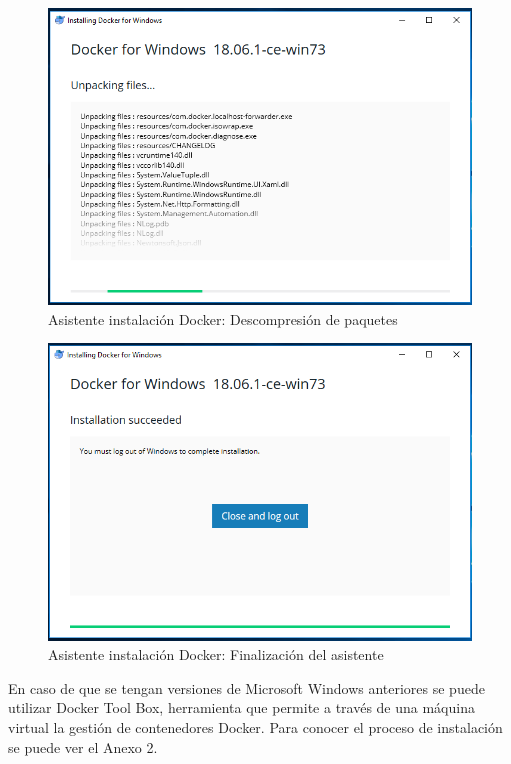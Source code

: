 \begin{figure}[!hbtp]
	\centering
	\includegraphics[width=\linewidth]{RE05_Docker/Instalacion_Windows/REDocker_Instalacion_Windows03.png}
	\vspace{-0.2cm}
	\caption{Asistente instalación Docker: Descompresión de paquetes}
	\label{fig:InstalacionDockerWin3}
\end{figure}

\begin{figure}[!hbtp]
	\centering
	\includegraphics[width=\linewidth]{RE05_Docker/Instalacion_Windows/REDocker_Instalacion_Windows04.png}
	\vspace{-0.2cm}
	\caption{Asistente instalación Docker: Finalización del asistente}
	\label{fig:InstalacionDockerWin4}
\end{figure}

En caso de que se tengan versiones de Microsoft Windows anteriores se puede utilizar Docker Tool Box, herramienta que permite a través de una máquina virtual la gestión de contenedores Docker. Para conocer el proceso de instalación se puede ver el Anexo 2.